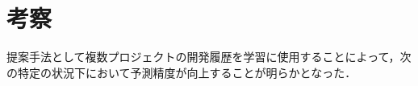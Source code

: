 \documentclass[T,J]{fose} %
\newcommand{\todo}[1]{\colorbox{yellow}{{\bf TODO}:}{\color{red} {\textbf{[#1]}}}}
\begin{document}





\section{考察}\label{sec:consideration}
提案手法として複数プロジェクトの開発履歴を学習に使用することによって，次の特定の状況下において予測精度が向上することが明らかとなった．
\end{document}
